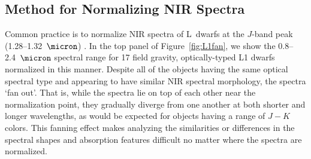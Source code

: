 \documentclass[12pt,preprint]{aastex}
\begin{document}
\subsection{Method for Normalizing NIR Spectra}
\label{sec:method}

Common practice is to normalize NIR spectra of L~dwarfs at the $J$-band peak (1.28--1.32~$\micron$) \citep[e.g.,][]{Kirkpatrick10}. 
In the top panel of Figure~\ref{fig:L1fan}, we show the 0.8--2.4~$\micron$ spectral range for 17 field gravity, optically-typed L1 dwarfs normalized in this manner.
Despite all of the objects having the same optical spectral type and appearing to have similar NIR spectral morphology, the spectra `fan out'. 
That is, while the spectra lie on top of each other near the normalization point, they gradually diverge from one another at both shorter and longer wavelengths, as would be expected for objects having a range of $J-K$ colors. 
This fanning effect makes analyzing the similarities or differences in the spectral shapes and absorption features difficult no matter where the spectra are normalized.

\end{document}
